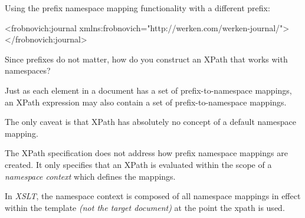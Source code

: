 \documentclass[20pt,landscape,headrule,footrule]{foils}
\begin{document}
Using the prefix namespace mapping functionality with a different
prefix:

\begin{codelisting}
<frobnovich:journal xmlns:frobnovich="http://werken.com/werken-journal/">
</frobnovich:journal>
\end{codelisting}



Since prefixes do not matter, how do you construct an XPath that
works with namespaces?

\begin{center}
\end{center}

Just as each element in a document has a set of prefix-to-namespace
mappings, an XPath expression may also contain a set of
prefix-to-namespace mappings.

The only caveat is that XPath has absolutely no concept of a default
namespace mapping.  




The XPath specification does not address how prefix namespace mappings
are created.  It only specifies that an XPath is evaluated within the
scope of a \emph{namespace context} which defines the mappings.

In \emph{XSLT}, the namespace context is composed of all namespace
mappings in effect within the template \emph{(not the target document)}
at the point the xpath is used.

\begin{codelisting}
\end{codelisting}

\end{document}
